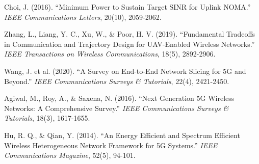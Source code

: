 \documentclass[journal]{IEEEtran}
\begin{document}
\begin{thebibliography}{1}
  Choi, J. (2016). ``Minimum Power to Sustain Target SINR for Uplink NOMA.'' \textit{IEEE Communications Letters}, 20(10), 2059-2062.
  
  Zhang, L., Liang, Y. C., Xu, W., \& Poor, H. V. (2019). ``Fundamental Tradeoffs in Communication and Trajectory Design for UAV-Enabled Wireless Networks.'' \textit{IEEE Transactions on Wireless Communications}, 18(5), 2892-2906.
  
  Wang, J. et al. (2020). ``A Survey on End-to-End Network Slicing for 5G and Beyond.'' \textit{IEEE Communications Surveys \& Tutorials}, 22(4), 2421-2450.
  
  Agiwal, M., Roy, A., \& Saxena, N. (2016). ``Next Generation 5G Wireless Networks: A Comprehensive Survey.'' \textit{IEEE Communications Surveys \& Tutorials}, 18(3), 1617-1655.
  
  Hu, R. Q., \& Qian, Y. (2014). ``An Energy Efficient and Spectrum Efficient Wireless Heterogeneous Network Framework for 5G Systems.'' \textit{IEEE Communications Magazine}, 52(5), 94-101.
  

\end{thebibliography}
\end{document}
